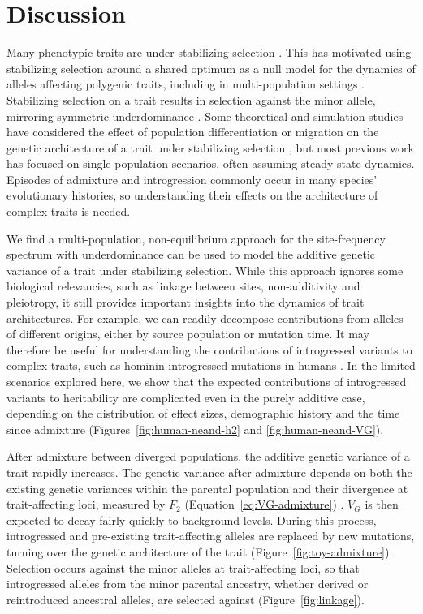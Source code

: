 \documentclass{article}
\begin{document}
\section*{Discussion}

Many phenotypic traits are under stabilizing selection \citep{hodgins2015gene,
sanjak2018evidence, sella2019thinking}. This has motivated using stabilizing
selection around a shared optimum as a null model for the dynamics of alleles
affecting polygenic traits, including in multi-population settings
\citep{yair2022population}. Stabilizing selection on a trait results in
selection against the minor allele, mirroring symmetric underdominance
\citep{robertson1956effect, keightley1988quantitative}. Some theoretical and
simulation studies have considered the effect of population differentiation or
migration on the genetic architecture of a trait under stabilizing selection
\citep[e.g.,][]{tufto2000quantitative, yeaman2011genetic, yair2022population},
but most previous work has focused on single population scenarios, often
assuming steady state dynamics. Episodes of admixture and introgression
commonly occur in many species' evolutionary histories, so understanding their
effects on the architecture of complex traits is needed.

We find a multi-population, non-equilibrium approach for the site-frequency
spectrum with underdominance can be used to model the additive genetic variance
of a trait under stabilizing selection. While this approach ignores some
biological relevancies, such as linkage between sites, non-additivity and
pleiotropy, it still provides important insights into the dynamics of trait
architectures. For example, we can readily decompose contributions from alleles
of different origins, either by source population or mutation time. It may
therefore be useful for understanding the contributions of introgressed
variants to complex traits, such as hominin-introgressed mutations in humans
\citep{reilly2022contribution, wei2023lingering}. In the limited scenarios
explored here, we show that the expected contributions of introgressed variants
to heritability are complicated even in the purely additive case, depending on
the distribution of effect sizes, demographic history and the time since
admixture (Figures~\ref{fig:human-neand-h2} and \ref{fig:human-neand-VG}).

After admixture between diverged populations, the additive genetic variance of
a trait rapidly increases. The genetic variance after admixture depends on both
the existing genetic variances within the parental population and their
divergence at trait-affecting loci, measured by $F_2$
(Equation~\ref{eq:VG-admixture}) \citep[see also,][]{veller2024stabilizing}.
$V_G$ is then expected to decay fairly quickly to background levels. During
this process, introgressed and pre-existing trait-affecting alleles are
replaced by new mutations, turning over the genetic architecture of the trait
(Figure~\ref{fig:toy-admixture}). Selection occurs against the minor alleles at
trait-affecting loci, so that introgressed alleles from the minor parental
ancestry, whether derived or reintroduced ancestral alleles, are selected
against (Figure~\ref{fig:linkage}).
\end{document}
